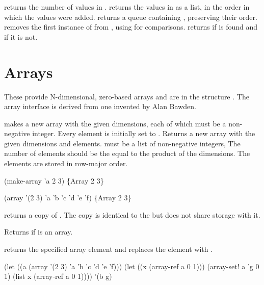 \begin{protos}
\end{protos}
\noindent
{} returns the number of values in .
 returns the values in  as a list, in the
 order in which the values were added.
 returns a queue containing , preserving
 their order.
 removes the first instance of  from
 , using  for comparisons.
 returns  if  is found and
  if it is not.

\section{Arrays}

These provide N-dimensional, zero-based arrays and
 are in the structure .
The array interface is derived from one invented by Alan Bawden.

\begin{protos}
\end{protos}
\noindent
{} makes a new array with the given dimensions, each of which
 must be a non-negative integer.
Every element is initially set to .
 Returns a new array with the given dimensions and elements.
 must be a list of non-negative integers, 
The number of elements should be the equal to the product of the
 dimensions.
The elements are stored in row-major order.
\begin{example}
(make-array 'a 2 3) \evalsto \{Array 2 3\}

(array '(2 3) 'a 'b 'c 'd 'e 'f)
    \evalsto \{Array 2 3\}
\end{example}

 returns a copy of .
The copy is identical to the  but does not share storage with it.

\begin{protos}
\end{protos}
\noindent
Returns  if  is an array.

\begin{protos}
\end{protos}
\noindent
{} returns the specified array element and 
 replaces the element with .
\begin{example}
(let ((a (array '(2 3) 'a 'b 'c 'd 'e 'f)))
  (let ((x (array-ref a 0 1)))
    (array-set! a 'g 0 1)
    (list x (array-ref a 0 1))))
    \evalsto '(b g)
\end{example}

